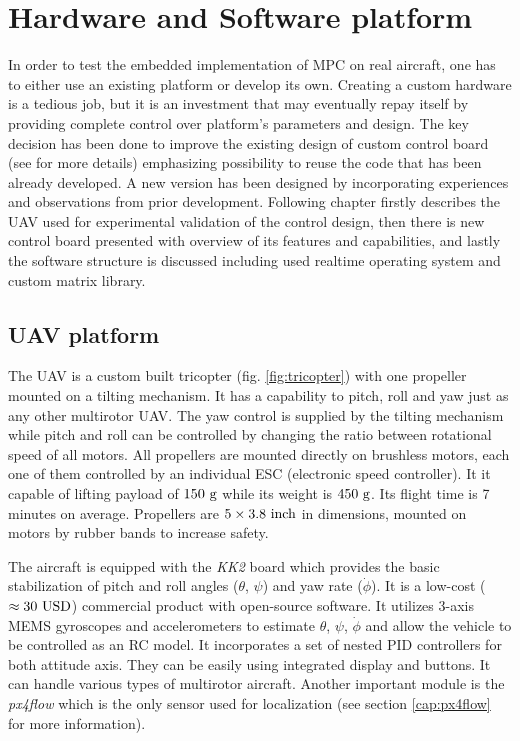 \section{Hardware and Software platform}

In order to test the embedded implementation of MPC on real aircraft, one has to either use an existing platform or develop its own. Creating a custom hardware is a tedious job, but it is an investment that may eventually repay itself by providing complete control over platform's parameters and design. The key decision has been done to improve the existing design of custom control board (see \citep{baca2013} for more details) emphasizing possibility to reuse the code that has been already developed. A new version has been designed by incorporating experiences and observations from prior development. Following chapter firstly describes the UAV used for experimental validation of the control design, then there is new control board presented with overview of its features and capabilities, and lastly the software structure is discussed including used realtime operating system and custom matrix library.

\subsection{UAV platform}

The UAV is a custom built tricopter (fig. \ref{fig:tricopter}) with one propeller mounted on a tilting mechanism. It has a capability to pitch, roll and yaw just as any other multirotor UAV. The yaw control is supplied by the tilting mechanism while pitch and roll can be controlled by changing the ratio between rotational speed of all motors. All propellers are mounted directly on brushless motors, each one of them controlled by an individual ESC (electronic speed controller). It it capable of lifting payload of $150 ~\mathrm{g}$ while its weight is $450~\mathrm{g}$. Its flight time is 7 minutes on average. Propellers are $5\times3.8 ~\mathrm{inch}$ in dimensions, mounted on motors by rubber bands to increase safety.

The aircraft is equipped with the \textit{KK2} board which provides the basic stabilization of pitch and roll angles ($\theta$, $\psi$) and yaw rate ($\dot{\phi}$). It is a low-cost ($\approx 30~\mathrm{USD}$) commercial product with open-source software. It utilizes 3-axis MEMS gyroscopes and accelerometers to estimate $\theta$, $\psi$, $\dot{\phi}$ and allow the vehicle to be controlled as an RC model. It incorporates a set of nested PID controllers for both attitude axis. They can be easily using integrated display and buttons. It can handle various types of multirotor aircraft. Another important module is the \textit{px4flow} which is the only sensor used for localization (see section \ref{cap:px4flow} for more information).

